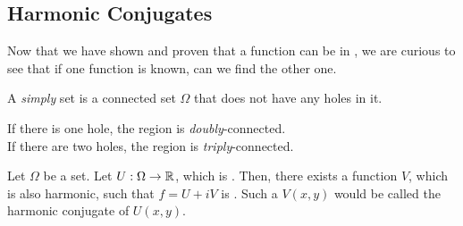 \subsection{Harmonic Conjugates}\label{subsec:Harmonic_Conjugates}
Now that we have shown and proven that a function can be  in , we are curious to see that if one function is known, can we find the other one.

\begin{definition}[Simply]\label{def:Simply}
  A \emph{simply}  set is a connected set $\Omega$ that does not have any holes in it.

  \begin{remark}\label{rmk:Multiply_Connected}
    If there is one hole, the region is \emph{doubly}-connected. \\
    If there are two holes, the region is \emph{triply}-connected.
  \end{remark}
\end{definition}

\begin{theorem}\label{thm:Harmonic_Conjugate}
  Let $\Omega$ be a    set.
  Let $U: \Omega \to \operatorname{\mathbb{R}}$, which is .
  Then, there exists a function $V$, which is also harmonic, such that $f = U + iV$ is .
  Such a $V(x, y)$ would be called the harmonic conjugate of $U(x, y)$.
\end{theorem}


